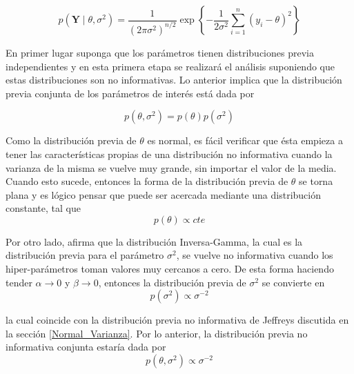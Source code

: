 \begin{equation*}
p(\mathbf{Y} \mid \theta, \sigma^2)=\frac{1}{(2\pi\sigma^2)^{n/2}}\exp\left\{-\frac{1}{2\sigma^2}\sum_{i=1}^n(y_i-\theta)^2\right\}
\end{equation*}

En primer lugar suponga que los parámetros tienen distribuciones previa independientes y en esta primera etapa se realizará el análisis suponiendo que estas distribuciones son no informativas. Lo anterior implica que la distribución previa conjunta de los parámetros de interés está dada por

\begin{equation}
p(\theta,\sigma^2)=p(\theta)p(\sigma^2)
\end{equation}

Como la distribución previa de $\theta$ es normal, es fácil verificar que ésta empieza a tener las características propias de una distribución no informativa cuando la varianza de la misma se vuelve muy grande, sin importar el valor de la media. Cuando esto sucede, entonces la forma de la distribución previa de $\theta$ se torna plana y es lógico pensar que puede ser acercada mediante una distribución constante, tal que
\begin{equation*}
p(\theta)\propto cte
\end{equation*}

Por otro lado,  afirma que la distribución Inversa-Gamma, la cual es la distribución previa para el parámetro $\sigma^2$, se vuelve no informativa cuando los hiper-parámetros toman valores muy cercanos a cero. De esta forma haciendo tender $\alpha \longrightarrow 0$ y $\beta \longrightarrow 0$, entonces la distribución previa de $\sigma^2$ se convierte en
\begin{equation*}
p(\sigma^2)\propto \sigma^{-2}
\end{equation*}

la cual coincide con la distribución previa no informativa de Jeffreys discutida en la sección \ref{Normal_Varianza}. Por lo anterior, la distribución previa no informativa conjunta estaría dada por
\begin{equation}\label{previa_noinfo_conjunta}
p(\theta,\sigma^2)\propto \sigma^{-2}
\end{equation}


